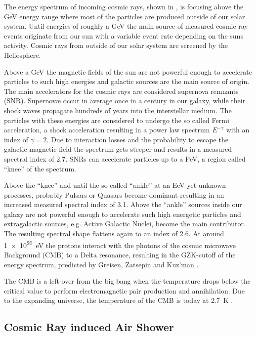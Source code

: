 The energy spectrum of incoming cosmic rays, shown in , is focusing above the GeV energy range where most of the particles are produced outside of our solar system.
Until energies of roughly a GeV the main source of measured cosmic ray events originate from our sun with a variable event rate depending on the suns activity.
Cosmic rays from outside of our solar system are screened by the Heliosphere.

Above a GeV the magnetic fields of the sun are not powerful enough to accelerate particles to such high energies and galactic sources are the main source of origin.
The main accelerators for the cosmic rays are considered supernova remnants (SNR).
Supernov\ae{} occur in average once in a century in our galaxy, while their shock waves propagate hundreds of years into the interstellar medium.
The particles with these energies are considered to undergo the so called Fermi acceleration, a shock acceleration resulting in a power law spectrum $E^{-\gamma}$ with an index of $\gamma = \num{2}$.
Due to interaction losses and the probability to escape the galactic magnetic field the spectrum gets steeper and results in a measured spectral index of \num{2.7}.
SNRs can accelerate particles up to a PeV, a region called \enquote{knee} of the spectrum.

Above the \enquote{knee} and until the so called \enquote{ankle} at an EeV yet unknown processes, probably Pulsars or Quasars become dominant resulting in an increased measured spectral index of \num{3.1}.
Above the \enquote{ankle} sources inside our galaxy are not powerful enough to accelerate such high energetic particles and extragalactic sources, e.g. Active Galactic Nuclei, become the main contributor.
The resulting spectral shape flattens again to an index of \num{2.6}.
At around \SI{1e20}{eV} the protons interact with the photons of the cosmic microwave Background (CMB) to a Delta resonance, resulting in the GZK-cutoff of the energy spectrum, predicted by Greisen, Zatsepin and Kuz'man \cite{Greisen66GZK, Zatsepin66GZK}.

The CMB is a left-over from the big bang when the temperature drops below the critical value to perform electromagnetic pair production and annihilation.
Due to the expanding universe, the temperature of the CMB is today at \SI{2.7}{K} \cite{PDG20}.

\subsection{Cosmic Ray induced Air Shower} \label{sec:air_shower}

